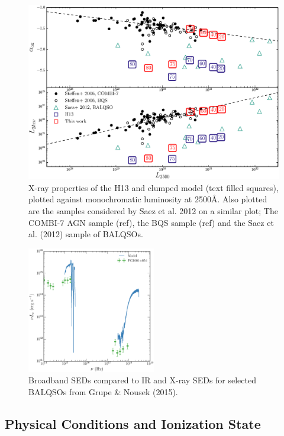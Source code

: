 \documentclass[useAMS,usenatbib]{mn2e_x}
\begin{document}
\begin{figure} %
\centering
\includegraphics[width=1.0\textwidth]{figures/alpha_ox_both.eps}
\caption
{
X-ray properties of the H13 and clumped model (text filled 
squares), plotted against monochromatic luminosity 
at 2500\AA. Also plotted are the samples considered by
Saez et al. 2012 on a similar plot; The COMBI-7 AGN sample (ref),
the BQS sample (ref) and the Saez et al. (2012) sample of BALQSOs.
}
\label{fig:xray}
\end{figure} %

\begin{figure}
\centering
\includegraphics[width=0.5\textwidth]{figures/xray_spectrum_lnu.eps}
\caption
{
Broadband SEDs compared to IR and X-ray SEDs for selected BALQSOs 
from Grupe \& Nousek (2015).
}
\label{fig:xray}
\end{figure}

\subsection{Physical Conditions and Ionization State}
\end{document}

